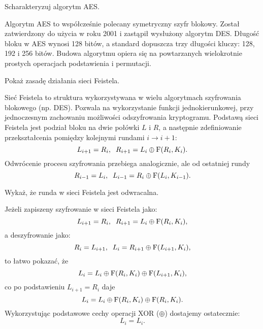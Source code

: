 \documentclass[answers,11pt]{exam}
\begin{document}
\begin{questions}
\question Scharakteryzuj algorytm AES.
\begin{solution}
Algorytm AES to współcześnie polecany symetryczny szyfr blokowy. Został zatwierdzony do użycia w roku 2001 i zastąpił wysłużony algorytm DES. Długość bloku w AES wynosi 128 bitów, a standard dopuszcza trzy długości kluczy: 128, 192 i 256 bitów. Budowa algorytmu opiera się na powtarzanych wielokrotnie prostych operacjach podstawienia i permutacji. 
\end{solution}

\question Pokaż zasadę działania sieci Feistela.
\begin{solution} 
Sieć Feistela to struktura wykorzystywana w wielu algorytmach szyfrowania blokowego (np. DES). Pozwala na wykorzystanie funkcji jednokierunkowej, przy jednoczesnym zachowaniu możliwości odszyfrowania kryptogramu. Podstawą sieci Feistela jest podział bloku na dwie połówki $L$ i $R$, a następnie zdefiniowanie przekształcenia pomiędzy kolejnymi rundami $i \rightarrow i+1$:
\begin{equation}
L_{i+1} = R_i, \;\; R_{i+1}= L_i \oplus {\rm F}(R_i, K_i).
\end{equation}
Odwrócenie procesu szyfrowania przebiega analogicznie, ale od ostatniej rundy
\begin{equation}
R_{i-1} = L_{i},\;\; L_{i-1} = R_{i} \oplus {\rm F}(L_{i}, K_{i-1}).
\end{equation}
\end{solution}

\question Wykaż, że runda w sieci Feistela jest odwracalna.
\begin{solution} 
Jeżeli zapiszeny szyfrowanie w sieci Feistela jako:
\begin{equation}
L_{i+1} = R_i, \;\; R_{i+1}= L_i \oplus {\rm F}(R_i, K_i),
\end{equation}
a deszyfrowanie jako:
\begin{equation}
R_{i} = L_{i+1},\;\; L_{i} = R_{i+1} \oplus {\rm F}(L_{i+1}, K_{i}),
\end{equation}
to łatwo pokazać, że
\begin{equation}
L_{i} = L_i \oplus {\rm F}(R_i, K_i) \oplus {\rm F}(L_{i+1}, K_{i}),
\end{equation}
co po podstawieniu $L_{i+1} = R_i$ daje
\begin{equation}
L_{i} = L_i \oplus {\rm F}(R_i, K_i) \oplus {\rm F}(R_i, K_{i}).
\end{equation}
Wykorzystując podstawowe cechy operacji XOR ($\oplus$) dostajemy ostatecznie:
\begin{equation}
L_{i} = L_i.
\end{equation}
\end{solution} 



\end{questions}
\end{document}
